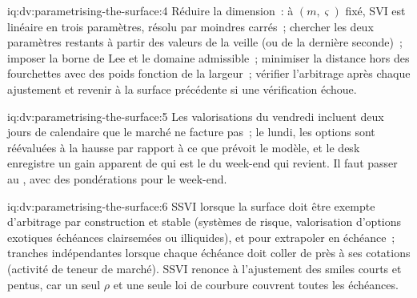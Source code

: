 \begin{solution}{iq:dv:parametrising-the-surface:4}
Réduire la dimension~: à $(m,\varsigma)$ fixé, SVI est linéaire en trois paramètres, résolu par moindres carrés~;
chercher les deux paramètres restants à partir des valeurs de la veille (ou de la dernière seconde)~; imposer la borne de Lee et le
domaine admissible~; minimiser la distance hors des fourchettes avec des poids fonction de la largeur~; vérifier l'arbitrage après chaque
ajustement et revenir à la surface précédente si une vérification échoue.
\end{solution}

\begin{solution}{iq:dv:parametrising-the-surface:5}
Les valorisations du vendredi incluent deux jours de  calendaire que le marché ne facture pas~; le lundi, les
options sont réévaluées à la hausse par rapport à ce que prévoit le modèle, et le desk enregistre un gain apparent de  qui est
le  du week-end qui revient. Il faut passer au , avec des pondérations pour le week-end.
\end{solution}

\begin{solution}{iq:dv:parametrising-the-surface:6}
SSVI lorsque la surface doit être exempte d'arbitrage par construction et stable (systèmes de risque, valorisation d'options exotiques
échéances clairsemées ou illiquides), et pour extrapoler en échéance~; tranches indépendantes lorsque chaque échéance
doit coller de près à ses cotations (activité de teneur de marché). SSVI renonce à l'ajustement des smiles courts et pentus, car
un seul $\rho$ et une seule loi de courbure couvrent toutes les échéances.
\end{solution}
